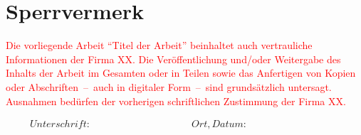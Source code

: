 \section*{Sperrvermerk}

\textcolor{red}{
Die vorliegende Arbeit \enquote{Titel der Arbeit} beinhaltet auch vertrauliche Informationen der Firma XX.
Die Veröffentlichung und/oder Weitergabe des Inhalts der Arbeit im Gesamten oder in Teilen sowie das Anfertigen von Kopien oder Abschriften~--~auch in digitaler Form~--~sind grundsätzlich untersagt.
Ausnahmen bedürfen der vorherigen schriftlichen Zustimmung der Firma XX.}

\vspace{3cm}

\begin{displaymath}
\begin{array}{ll}
Unterschrift:~~~~~~~~~~~~~~~~~~~~~~~~~~~~~~~~~~~~~~~~~~
& Ort, Datum:~~~~~~~~~~~~~~~~~~~~~~~~~~~~~~~~~~~~~~~~~~
\end{array}
\end{displaymath}



